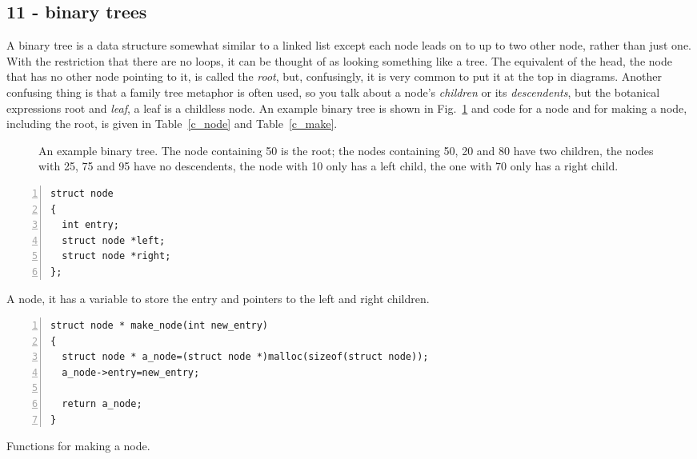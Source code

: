 \documentclass[11pt,a4paper]{scrartcl}
\begin{document}
\subsection*{11 - binary trees}


A binary tree is a data structure somewhat similar to a linked list
except each node leads on to up to two other node, rather than just
one. With the restriction that there are no loops, it can be thought
of as looking something like a tree. The equivalent of the head, the
node that has no other node pointing to it, is called the {\sl root},
but, confusingly, it is very common to put it at the top in
diagrams. Another confusing thing is that a family tree metaphor is
often used, so you talk about a node's {\sl children} or its {\sl
  descendents}, but the botanical expressions root and {\sl leaf}, a
leaf is a childless node. An example binary tree is shown in
Fig.~\ref{fig_example_tree} and code for a node and for making a node,
including the root, is given in Table~\ref{c_node} and
Table~\ref{c_make}.

\begin{figure}
\begin{center}
\end{center}
\caption{An example binary tree. The node containing 50 is the root; the nodes containing 50, 20 and 80 have two children, the nodes with 25, 75 and 95 have no descendents, the node with 10 only has a left child, the one with 70 only has a right child.\label{fig_example_tree}}
\end{figure}


\begin{table}
\begin{lstlisting}[numbers=left]
struct node
{
  int entry;
  struct node *left;
  struct node *right;
};
\end{lstlisting}
\caption{A node, it has a variable to store the entry and pointers to the left and right children. \label{c_node}}
\end{table}


\begin{table}
\begin{lstlisting}[numbers=left]
struct node * make_node(int new_entry)
{
  struct node * a_node=(struct node *)malloc(sizeof(struct node));
  a_node->entry=new_entry;

  return a_node;
}
\end{lstlisting}
\caption{Functions for making a node. \label{c_make}}
\end{table}
\end{document}
